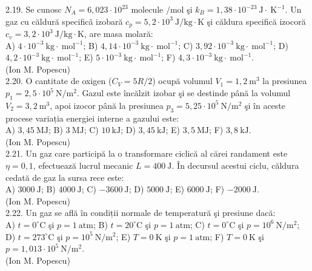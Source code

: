 2.19. Se cunosc $N_{A}=6,023 \cdot 10^{23}$ molecule $/ \mathrm{mol}$ şi $k_{B}=1,38 \cdot 10^{-23} \mathrm{~J} \cdot \mathrm{~K}^{-1}$. Un gaz cu căldură specificã izobară $c_{p}=5,2 \cdot 10^{3} \mathrm{~J} / \mathrm{kg} \cdot \mathrm{K}$ şi căldura specifică izocoră $c_{v}=3,2 \cdot 10^{3} \mathrm{~J} / \mathrm{kg} \cdot \mathrm{K}$, are masa molară:\\ A) $4 \cdot 10^{-3} \mathrm{~kg} \cdot \mathrm{~mol}^{-1}$; B) $4,14 \cdot 10^{-3} \mathrm{~kg} \cdot \mathrm{~mol}^{-1}$; C) $3,92 \cdot 10^{-3} \mathrm{~kg} \cdot \mathrm{~mol}^{-1}$; D) $4,2 \cdot 10^{-3} \mathrm{~kg} \cdot \mathrm{~mol}^{-1}$; E) $5 \cdot 10^{-3} \mathrm{~kg} \cdot \mathrm{~mol}^{-1}$; F) $4,3 \cdot 10^{-3} \mathrm{~kg} \cdot \mathrm{~mol}^{-1}$.\\ (Ion M. Popescu)\\

2.20. O cantitate de oxigen ($C_{V}=5 R / 2$) ocupă volumul $V_{1}=1,2 \mathrm{~m}^{3}$ la presiunea $p_{1}=2,5 \cdot 10^{5} \mathrm{~N} / \mathrm{m}^{2}$. Gazul este încălzit izobar şi se destinde până la volumul $V_{2}=3,2 \mathrm{~m}^{3}$, apoi izocor până la presiunea $p_{3}=5,25 \cdot 10^{5} \mathrm{~N} / \mathrm{m}^{2}$ şi în aceste procese variația energiei interne a gazului este:\\ A) $3,45 \mathrm{~MJ}$; B) $3 \mathrm{~MJ}$; C) $10 \mathrm{~kJ}$; D) $3,45 \mathrm{~kJ}$; E) $3,5 \mathrm{~MJ}$; F) $3,8 \mathrm{~kJ}$.\\ (Ion M. Popescu)\\

2.21. Un gaz care participă la o transformare ciclică al cărei randament este $\eta=0,1$, efectuează lucrul mecanic $L=400 \mathrm{~J}$. În decursul acestui ciclu, căldura cedată de gaz la sursa rece este:\\ A) $3000 \mathrm{~J}$; B) $4000 \mathrm{~J}$; C) $-3600 \mathrm{~J}$; D) $5000 \mathrm{~J}$; E) $6000 \mathrm{~J}$; F) $-2000 \mathrm{~J}$.\\ (Ion M. Popescu)\\

2.22. Un gaz se află în condiții normale de temperatură şi presiune dacă:\\ A) $t=0^{\circ} \mathrm{C}$ şi $p=1\mathrm{~atm}$; B) $t=20^{\circ} \mathrm{C}$ şi $p=1 \mathrm{~atm}$; C) $t=0^{\circ} \mathrm{C}$ şi $p=10^{6} \mathrm{~N} / \mathrm{m}^{2}$; D) $t=273^{\circ} \mathrm{C}$ şi $p=10^{5} \mathrm{~N} / \mathrm{m}^{2}$; E) $T=0 \mathrm{~K}$ şi $p=1 \mathrm{~atm}$; F) $T=0 \mathrm{~K}$ şi $p=1,013 \cdot 10^{5} \mathrm{~N} / \mathrm{m}^{2}$.\\ (Ion M. Popescu)\\

